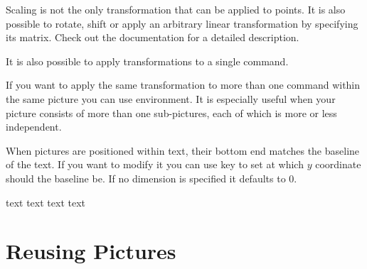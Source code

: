 Scaling is not the only transformation that can be applied to points. It is
also possible to rotate, shift or apply an arbitrary linear transformation by
specifying its matrix. Check out the documentation for a detailed description.
\begin{example}
\end{example}
It is also possible to apply transformations to a single command.
\begin{example}
\end{example}
If you want to apply the same transformation to more than one command within
the same picture you can use  environment. It is especially useful
when your picture consists of more than one sub-pictures, each of which is more
or less independent.
\begin{example}[vertical_mode, examplewidth=0.7\linewidth]
\end{example}

When \TikZ{} pictures are positioned within text, their bottom end matches the
baseline of the text. If you want to modify it you can use  key
to set at which \(y\) coordinate should the baseline be. If no dimension is
specified it defaults to \(0\).
\begin{example}[vertical_mode, examplewidth=0.8\linewidth]
text 
text 
text  text
\end{example}

\section{Reusing Pictures}

